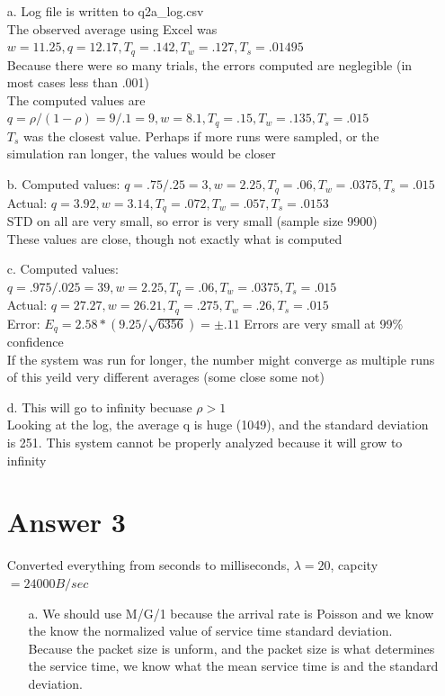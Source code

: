 \documentclass[11pt]{article}
\theoremstyle{definition}
\begin{document}
\begin{enumerate}
	\item[a.] Log file is written to q2a_log.csv\\
	The observed average using Excel was $w = 11.25, q = 12.17, T_q = .142, T_w = .127, T_s = .01495$\\
	Because there were so many trials, the errors computed are neglegible (in most cases less than .001)\\
	The computed values are $q = \rho / (1 - \rho) = 9 / .1 = 9, w = 8.1, T_q = .15, T_w = .135, T_s = .015$\\
	$T_s$ was the closest value.  Perhaps if more runs were sampled, or the simulation ran longer, the values would be closer
	
	\item[b.] Computed values: $q = .75/.25 = 3, w = 2.25, T_q = .06, T_w = .0375, T_s = .015$\\
			Actual: $q = 3.92, w = 3.14, T_q = .072, T_w = .057, T_s = .0153$\\
			STD on all are very small, so error is very small (sample size 9900)\\
			These values are close, though not exactly what is computed
	
	\item[c.] Computed values: $q = .975/.025 = 39, w = 2.25, T_q = .06, T_w = .0375, T_s = .015$\\
	Actual: $q = 27.27, w = 26.21, T_q = .275, T_w = .26, T_s = .015$\\
	Error:  $E_q = 2.58 * (9.25 / \sqrt{6356}) = \pm.11$ Errors are very small at 99\% confidence\\
	If the system was run for longer, the number might converge as multiple runs of this yeild very different averages (some close some not)
	
	\item[d.] This will go to infinity becuase $\rho > 1$\\
	Looking at the log, the average q is huge (1049), and the standard deviation is 251.  This system cannot be properly analyzed because it will grow to infinity

\section*{Answer 3}
Converted everything from seconds to milliseconds, $\lambda = 20$, capcity $= 24000B/sec$
\begin{enumerate}
	\item[a.] We should use M/G/1 because the arrival rate is Poisson and we know the know the normalized value of service time standard deviation. Because the packet
	size is unform, and the packet size is what determines the service time, we know what the mean service time is and the standard deviation.
	

\end{enumerate}
\end{enumerate}
\end{document}
